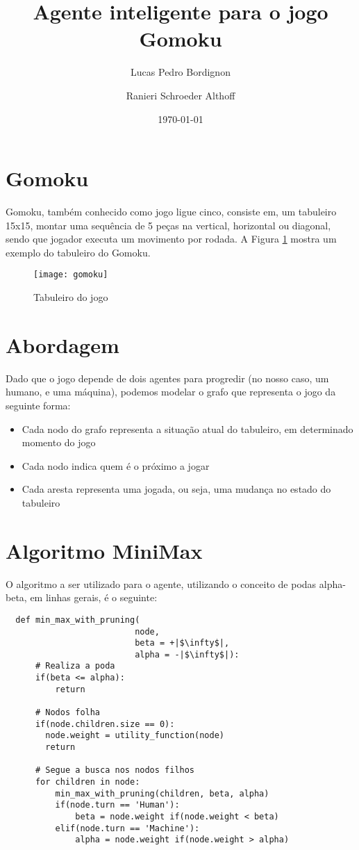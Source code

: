 \documentclass{article}
\title{Agente inteligente para o jogo Gomoku}
\author{Lucas Pedro Bordignon \and Ranieri Schroeder Althoff}
\date{\today}
\begin{document}
\maketitle

\section{Gomoku}
Gomoku, também conhecido como jogo ligue cinco, consiste em, um tabuleiro 15x15, montar uma sequência de 5 peças na
vertical, horizontal ou diagonal, sendo que jogador executa um
movimento por rodada. A Figura \ref{fig:gomoku} mostra um exemplo do tabuleiro do Gomoku.

\begin{figure}[h!]
  \centering
  \texttt{[image: gomoku]}
  \caption{Tabuleiro do jogo}
  \label{fig:gomoku}
\end{figure}

\section{Abordagem}
Dado que o jogo depende de dois agentes para progredir (no nosso caso, um humano, e uma máquina), podemos modelar o
grafo que representa o jogo da seguinte forma:

\begin{itemize}
  \item Cada nodo do grafo representa a situação atual do tabuleiro, em determinado momento do jogo
  \item Cada nodo indica quem é o próximo a jogar
  \item Cada aresta representa uma jogada, ou seja, uma mudança no estado do tabuleiro
\end{itemize}

\section{Algoritmo MiniMax}
O algoritmo a ser utilizado para o agente, utilizando o conceito de podas alpha-beta, em linhas gerais, é o seguinte:

\begin{verbatim}
  def min_max_with_pruning(
                          node,
                          beta = +|$\infty$|,
                          alpha = -|$\infty$|):
      # Realiza a poda
      if(beta <= alpha):
          return

      # Nodos folha
      if(node.children.size == 0):
        node.weight = utility_function(node)
        return

      # Segue a busca nos nodos filhos
      for children in node:
          min_max_with_pruning(children, beta, alpha)
          if(node.turn == 'Human'):
              beta = node.weight if(node.weight < beta)
          elif(node.turn == 'Machine'):
              alpha = node.weight if(node.weight > alpha)
\end{verbatim}
\end{document}
